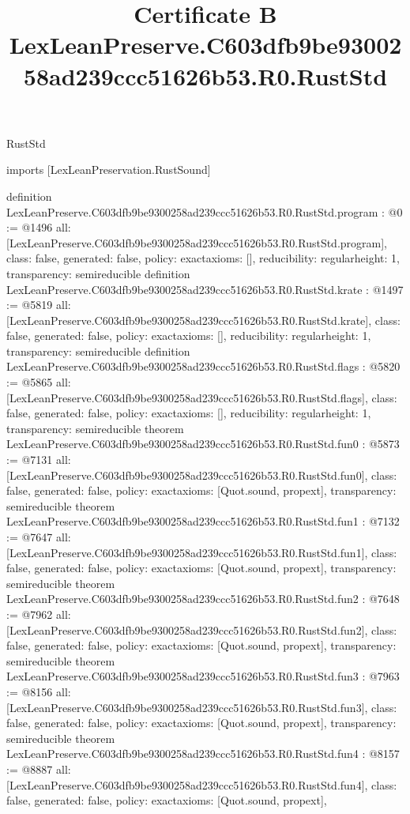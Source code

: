 \begin{lexlean}{RustStd}
\title{Certificate B LexLeanPreserve.C603dfb9be9300258ad239ccc51626b53.R0.RustStd}
\begin{coremodule}
imports [LexLeanPreservation.RustSound]

definition LexLeanPreserve.C603dfb9be9300258ad239ccc51626b53.R0.RustStd.program : @0 := @1496 {
  all: [LexLeanPreserve.C603dfb9be9300258ad239ccc51626b53.R0.RustStd.program],
  class: false,
  generated: false,
  policy: exact{axioms: []},
  reducibility: regular{height: 1},
  transparency: semireducible
}
definition LexLeanPreserve.C603dfb9be9300258ad239ccc51626b53.R0.RustStd.krate : @1497 := @5819 {
  all: [LexLeanPreserve.C603dfb9be9300258ad239ccc51626b53.R0.RustStd.krate],
  class: false,
  generated: false,
  policy: exact{axioms: []},
  reducibility: regular{height: 1},
  transparency: semireducible
}
definition LexLeanPreserve.C603dfb9be9300258ad239ccc51626b53.R0.RustStd.flags : @5820 := @5865 {
  all: [LexLeanPreserve.C603dfb9be9300258ad239ccc51626b53.R0.RustStd.flags],
  class: false,
  generated: false,
  policy: exact{axioms: []},
  reducibility: regular{height: 1},
  transparency: semireducible
}
theorem LexLeanPreserve.C603dfb9be9300258ad239ccc51626b53.R0.RustStd.fun0 : @5873 := @7131 {
  all: [LexLeanPreserve.C603dfb9be9300258ad239ccc51626b53.R0.RustStd.fun0],
  class: false,
  generated: false,
  policy: exact{axioms: [Quot.sound, propext]},
  transparency: semireducible
}
theorem LexLeanPreserve.C603dfb9be9300258ad239ccc51626b53.R0.RustStd.fun1 : @7132 := @7647 {
  all: [LexLeanPreserve.C603dfb9be9300258ad239ccc51626b53.R0.RustStd.fun1],
  class: false,
  generated: false,
  policy: exact{axioms: [Quot.sound, propext]},
  transparency: semireducible
}
theorem LexLeanPreserve.C603dfb9be9300258ad239ccc51626b53.R0.RustStd.fun2 : @7648 := @7962 {
  all: [LexLeanPreserve.C603dfb9be9300258ad239ccc51626b53.R0.RustStd.fun2],
  class: false,
  generated: false,
  policy: exact{axioms: [Quot.sound, propext]},
  transparency: semireducible
}
theorem LexLeanPreserve.C603dfb9be9300258ad239ccc51626b53.R0.RustStd.fun3 : @7963 := @8156 {
  all: [LexLeanPreserve.C603dfb9be9300258ad239ccc51626b53.R0.RustStd.fun3],
  class: false,
  generated: false,
  policy: exact{axioms: [Quot.sound, propext]},
  transparency: semireducible
}
theorem LexLeanPreserve.C603dfb9be9300258ad239ccc51626b53.R0.RustStd.fun4 : @8157 := @8887 {
  all: [LexLeanPreserve.C603dfb9be9300258ad239ccc51626b53.R0.RustStd.fun4],
  class: false,
  generated: false,
  policy: exact{axioms: [Quot.sound, propext]},
}
\end{coremodule}
\end{lexlean}
